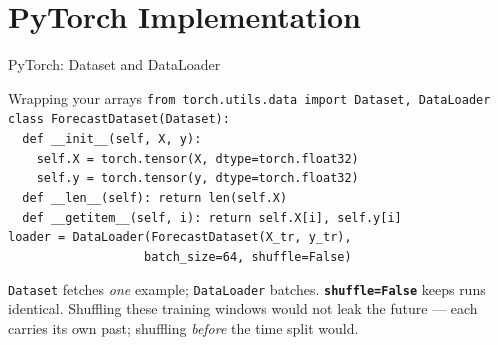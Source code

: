 \documentclass[aspectratio=169, 11pt]{beamer}
\begin{document}
\section{PyTorch Implementation}


\begin{frame}{PyTorch: Dataset and DataLoader}
  \begin{examplebox}{Wrapping your arrays}
    {\tiny\linespread{1.2}\selectfont
    \texttt{from torch.utils.data import Dataset, DataLoader}\\[2pt]
    \texttt{class ForecastDataset(Dataset):}\\
    \texttt{\mbox{}\ \ def \_\_init\_\_(self, X, y):}\\
    \texttt{\mbox{}\ \ \ \ self.X = torch.tensor(X, dtype=torch.float32)}\\
    \texttt{\mbox{}\ \ \ \ self.y = torch.tensor(y, dtype=torch.float32)}\\
    \texttt{\mbox{}\ \ def \_\_len\_\_(self): return len(self.X)}\\
    \texttt{\mbox{}\ \ def \_\_getitem\_\_(self, i): return self.X[i], self.y[i]}\\[3pt]
    \texttt{loader = DataLoader(ForecastDataset(X\_tr, y\_tr),}\\
    \texttt{\mbox{}\ \ \ \ \ \ \ \ \ \ \ \ \ \ \ \ \ \ \ batch\_size=64, shuffle=False)}
    }
  \end{examplebox}
  \texttt{Dataset} fetches \emph{one} example; \texttt{DataLoader} batches.
  \textbf{\texttt{shuffle=False}} keeps runs identical. Shuffling these training windows would not
  leak the future --- each carries its own past; shuffling \emph{before} the time split would.
\end{frame}
\end{document}
